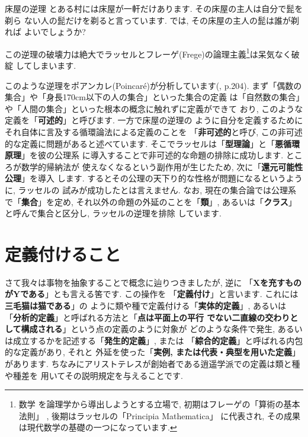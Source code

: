 \begin{itembox}[c]{{床屋の逆理}}
\quad とある村には床屋が一軒だけあります. その床屋の主人は自分で髭を剃ら
ない人の髭だけを剃ると言っています. では, その床屋の主人の髭は誰が剃れば
よいでしょうか?
\end{itembox}


この逆理の破壊力は絶大でラッセルとフレーゲ(Frege)の論理主義\footnote{数学
を論理学から導出しようとする立場で, 初期はフレーゲの「算術の基本法則」
\cite{フレーゲ}, 後期はラッセルの「Principia Mathematica」\cite{Russell}
に代表され, その成果は現代数学の基礎の一つになっています.}は呆気なく破綻
してしまいます.
\newline


このような逆理をポアンカレ(Poincar\'e)が分析しています(\cite{ポアンカレ},
p.204). まず「偶数の集合」や「身長170cm以下の人の集合」といった集合の定義
は「自然数の集合」や「人間の集合」といった根本の概念に触れずに定義ができて
おり, このような定義を「\textbf{可述的}」と呼びます. 一方で床屋の逆理の
ように自分を定義するためにそれ自体に言及する循環論法による定義のことを
「\textbf{非可述的}と呼び, この非可述的な定義に問題があると述べています.
 そこでラッセルは「\textbf{型理論}」と「\textbf{悪循環原理}」を彼の公理系
に導入することで非可述的な命題の排除に成功します. ところが数学的帰納法が
使えなくなるという副作用が生じたため, 次に「\textbf{還元可能性公理}」を導入
します. するとその公理の天下り的な性格が問題になるというように, ラッセルの
試みが成功したとは言えません\cite{Russell}. なお, 現在の集合論では公理系
で「\textbf{集合}」を定め, それ以外の命題の外延のことを「\textbf{類}」,
 あるいは「\textbf{クラス}」と呼んで集合と区分し, ラッセルの逆理を排除
しています.

\section{定義付けること}

さて我々は事物を抽象することで概念に辿りつきましたが, 逆に
「\textbf{Xを充すものがYである}」とも言える筈です. この操作を
「\textbf{定義付け}」と言います. これには\textbf{三毛猫は猫である}」の
ように類や種で定義付ける「\textbf{実体的定義}」, あるいは
「\textbf{分析的定義}」と呼ばれる方法と「\textbf{点は平面上の平行
でない二直線の交わりとして構成される}」という点の定義のように対象が
どのような条件で発生, あるいは成立するかを記述する「\textbf{発生的定義}」,
 または 「\textbf{綜合的定義}」と呼ばれる内包的な定義があり, それと
外延を使った「\textbf{実例, または代表・典型を用いた定義}」があります.
 ちなみにアリストテレスが創始者である逍遥学派での定義は類と種や種差を
用いてその説明規定を与えることです.


